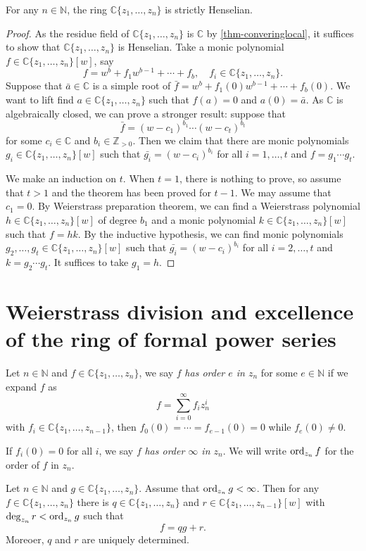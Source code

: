 \begin{thm}\label{thm-convpowerstrictHen}
    For any $n\in \mathbb{N}$, the ring $\mathbb{C}\{ z_1,\ldots,z_n \}$ is strictly Henselian.
\end{thm}
\begin{proof}
    As the residue field of $\mathbb{C}\{ z_1,\ldots,z_n \}$ is $\mathbb{C}$ by \cref{thm-converinglocal}, it suffices to show that $\mathbb{C}\{ z_1,\ldots,z_n \}$ is Henselian. Take a monic polynomial $f\in \mathbb{C}\{ z_1,\ldots,z_n \}[w]$, say
    \[
        f=w^b+f_1 w^{b-1}+\cdots+ f_b,\quad f_i\in \mathbb{C}\{ z_1,\ldots,z_n \}.
    \]
    Suppose that $\bar{a}\in \mathbb{C}$ is a simple root of $\bar{f}=w^b+f_1(0)w^{b-1}+\cdots+ f_b(0)$. We want to lift find $a\in \mathbb{C}\{ z_1,\ldots,z_n \}$ such that $f(a)=0$ and $a(0)=\bar{a}$. As $\mathbb{C}$ is algebraically closed, we can prove a stronger result: suppose that 
    \[
        \bar{f}=(w-c_1)^{b_1}\cdots (w-c_t)^{b_t}  
    \]
    for some $c_i\in \mathbb{C}$ and $b_i\in \mathbb{Z}_{>0}$. Then we claim that there are monic polynomials $g_i\in \mathbb{C}\{ z_1,\ldots,z_n \}[w]$ such that $\bar{g_i}=(w-c_i)^{b_i}$ for all $i=1,\ldots,t$ and $f=g_1\cdots g_t$.

    We make an induction on $t$. When $t=1$, there is nothing to prove, so assume that $t>1$ and the theorem has been proved for $t-1$. We may assume that $c_1=0$. By Weierstrass preparation theorem, we can find a Weierstrass polynomial $h\in \mathbb{C}\{ z_1,\ldots,z_n \}[w]$ of degree $b_1$ and a monic polynomial $k\in \mathbb{C}\{ z_1,\ldots,z_n \}[w]$ such that $f=hk$. By the inductive hypothesis, we can find monic polynomials $g_2,\ldots,g_t\in \mathbb{C}\{ z_1,\ldots,z_n \}[w]$ such that  $\bar{g_i}=(w-c_i)^{b_i}$ for all $i=2,\ldots,t$ and $k=g_2\cdots g_t$. It suffices to take $g_1=h$.
\end{proof}


\section{Weierstrass division and excellence of the ring of formal power series}
\begin{definition}
    Let $n\in \mathbb{N}$ and $f\in \mathbb{C}\{ z_1,\ldots,z_n\}$, we say $f$ \emph{has order $e$ in $z_n$} for some $e\in \mathbb{N}$ if we expand $f$ as
    \[
      f=\sum_{i=0}^{\infty}f_iz_n^i  
    \]
    with $f_i\in \mathbb{C}\{ z_1,\ldots,z_{n-1}\}$, then $f_0(0)=\cdots=f_{e-1}(0)=0$ while $f_e(0)\neq 0$.

    If $f_i(0)=0$ for all $i$, we say $f$ \emph{has order $\infty$ in $z_n$}. We will write $\operatorname{ord}_{z_n}f$ for the order of $f$ in $z_n$.
\end{definition}
\begin{thm}\label{thm-Weierstrassdiv}
    Let $n\in \mathbb{N}$ and $g\in \mathbb{C}\{ z_1,\ldots,z_n\}$. Assume that $\operatorname{ord}_{z_n}g<\infty$. Then for any $f\in \mathbb{C}\{ z_1,\ldots,z_n\}$ there is $q\in \mathbb{C}\{ z_1,\ldots,z_n\}$ and $r\in \mathbb{C}\{ z_1,\ldots,z_{n-1}\}[w]$ with $\deg_{z_n}r<\operatorname{ord}_{z_n}g$ such that
    \[
      f=qg+r.  
    \]
    Moreoer, $q$ and $r$ are uniquely determined.
\end{thm}

